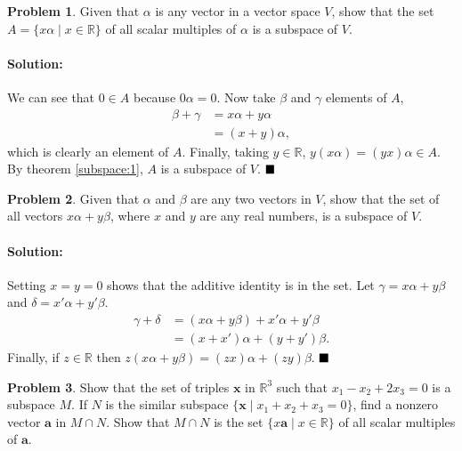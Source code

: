 \documentclass[]{article}
\newcommand{\RR}{\mathbb{R}}
\theoremstyle{definition}
\newtheorem{problem}{Problem}
\newenvironment{solution}{\paragraph{Solution:}}{\hfill$\blacksquare \\$}
\begin{document}
\begin{problem}
	Given that $\alpha$ is any vector in a vector space $V$, show that the set $A = \{x\alpha \mid x \in \RR \}$ of all scalar multiples of $\alpha$ is a subspace of $V$.
\end{problem}
\begin{solution}
	We can see that $0 \in A$  because $0 \alpha = 0$. Now take $\beta$ and $\gamma$ elements of $A$, 
	\begin{align*}
		\beta + \gamma &= x \alpha + y \alpha \\ 
		&= (x + y)\alpha,
	\end{align*}
	which is clearly an element of $A$. Finally, taking $y \in \RR$, $y(x\alpha) = (yx) \alpha \in A$.
	By theorem \ref{subspace:1}, $A$ is a subspace of $V$.
\end{solution}
\begin{problem}
	Given that $\alpha$ and $\beta$ are any two vectors in $V$, show that the set of all vectors $x\alpha + y\beta$, where $x$ and $y$ are any real numbers, is a subspace of $V$.
\end{problem}
\begin{solution}
	Setting $x = y = 0$ shows that the additive identity is in the set. Let $\gamma = x\alpha + y\beta$ and $\delta = x'\alpha + y'\beta$.
	\begin{align*}
		\gamma + \delta &= (x\alpha + y\beta) + x'\alpha + y'\beta \\
						&= (x+x')\alpha + (y + y')\beta.
	\end{align*}
	Finally, if $z \in \RR$ then $z(x\alpha + y\beta) = (zx)\alpha + (zy)\beta$.
\end{solution}
\begin{problem}
	Show that the set of triples $\mathbf{x}$ in $\RR^3$ such that $x_1 - x_2 + 2x_3 = 0$ is a subspace $M$. If $N$ is the similar subspace $\{ \mathbf{x} \mid x_1 + x_2 + x_3 = 0 \}$, find a nonzero vector $\textbf{a}$ in $M \cap N$. Show that $M \cap N$ is the set $\{x\mathbf{a} \mid x \in \RR \}$ of all scalar multiples of $\mathbf{a}$.
\end{problem}
\end{document}
